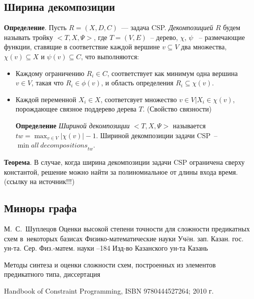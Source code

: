 \documentclass[12pt]{article}
\begin{document}
\subsection{Ширина декомпозиции}
\textbf{Определение}. Пусть $R = (X, D, C)$~--- задача CSP. \textit{Декомпозицией $R$} 
будем называть тройку $< T, X, \Psi >$, где $T = (V, E)$~-- дерево, $\chi$, $\psi$ ~-- 
размечающие функции, ставящие в соответствие каждой вершине $v \subseteq V$ два множества, $\chi(v) \subseteq X$
и $\psi(v) \subseteq C$, что выполняются:
\begin{itemize}
\item Каждому ограничению $R_i \in C$, соответствует как минимум одна вершина $v \in V$,
такая что $R_i \in \phi(v)$, и область определения $R_i \subseteq \chi(v)$.
\item Каждой переменной $X_i \in X$, соответсвует множество ${v \in V |X_i \in \chi(v)}$, порождающее
связное поддерево дерева $T$. (Свойство связности)

\textbf{Определение}
\textit{Шириной декомпозиции $ < T, X, \Psi >$} называется $tw = \max_{v \in V}{|\chi(v)| - 1}$.
Шириной декомпозиции задачи CSP~-- $\min{all~decompositions}_{tw}$.

\end{itemize}

\textbf{Теорема}. В случае, когда ширина декомпозиции задачи CSP ограничена сверху константой, 
решение можно найти за полиномиальное от длины входа время. (ссылку на источник!!!)

\subsection{Миноры графа}

\clearpage
{}
    \by М.~С.~Шуплецов
    \paper Оценки высокой степени точности для сложности предикатных схем в~некоторых базисах
    \inbook Физико-математические науки
    \serial Уч\"eн. зап. Казан. гос. ун-та. Сер. Физ.-матем. науки
    --184
    \publ Изд-во Казанского ун-та
    \publaddr Казань

Методы синтеза и оценки сложности схем, построенных из элементов предикатного типа, диссертация

 Handbook of Constraint Programming, ISBN 9780444527264; 2010 г.
\end{document}
